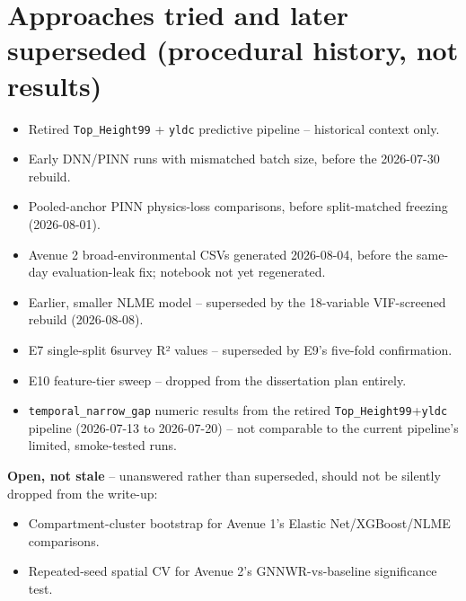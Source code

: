 \section*{Approaches tried and later superseded (procedural history, not results)}

\begin{itemize}
\setlength\itemsep{0pt}
\item Retired \texttt{Top\_Height99} + \texttt{yldc} predictive pipeline -- historical context only.
\item Early DNN/PINN runs with mismatched batch size, before the 2026-07-30 rebuild.
\item Pooled-anchor PINN physics-loss comparisons, before split-matched freezing (2026-08-01).
\item Avenue 2 broad-environmental CSVs generated 2026-08-04, before the same-day evaluation-leak
fix; notebook not yet regenerated.
\item Earlier, smaller NLME model -- superseded by the 18-variable VIF-screened rebuild (2026-08-08).
\item E7 single-split 6survey R² values -- superseded by E9's five-fold confirmation.
\item E10 feature-tier sweep -- dropped from the dissertation plan entirely.
\item \texttt{temporal\_narrow\_gap} numeric results from the retired \texttt{Top\_Height99}+\texttt{yldc}
pipeline (2026-07-13 to 2026-07-20) -- not comparable to the current pipeline's limited,
smoke-tested runs.
\end{itemize}

\textbf{Open, not stale} -- unanswered rather than superseded, should not be silently dropped from
the write-up:
\begin{itemize}
\setlength\itemsep{0pt}
\item Compartment-cluster bootstrap for Avenue 1's Elastic Net/XGBoost/NLME comparisons.
\item Repeated-seed spatial CV for Avenue 2's GNNWR-vs-baseline significance test.
\end{itemize}

